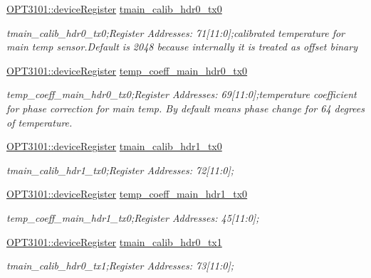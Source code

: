 \begin{DoxyCompactItemize}
\mbox{\hyperlink{class_o_p_t3101_1_1device_register}{O\+P\+T3101\+::device\+Register}} \mbox{\hyperlink{class_o_p_t3101_1_1registers_a8fae5df61376ad2ea79bb9b35ff75bed}{tmain\+\_\+calib\+\_\+hdr0\+\_\+tx0}}
\begin{DoxyCompactList}\small\item\em tmain\+\_\+calib\+\_\+hdr0\+\_\+tx0;Register Addresses\+: 71\mbox{[}11\+:0\mbox{]};calibrated temperature for main temp sensor.\+Default is 2048 because internally it is treated as offset binary \end{DoxyCompactList}\item 
\mbox{\hyperlink{class_o_p_t3101_1_1device_register}{O\+P\+T3101\+::device\+Register}} \mbox{\hyperlink{class_o_p_t3101_1_1registers_aafdc1b5540b6e0bb2ce2284f0b5206f1}{temp\+\_\+coeff\+\_\+main\+\_\+hdr0\+\_\+tx0}}
\begin{DoxyCompactList}\small\item\em temp\+\_\+coeff\+\_\+main\+\_\+hdr0\+\_\+tx0;Register Addresses\+: 69\mbox{[}11\+:0\mbox{]};temperature coefficient for phase correction for main temp. By default means phase change for 64 degrees of temperature. \end{DoxyCompactList}\item 
\mbox{\hyperlink{class_o_p_t3101_1_1device_register}{O\+P\+T3101\+::device\+Register}} \mbox{\hyperlink{class_o_p_t3101_1_1registers_a8014e98d54c2e1a92a2535da74900b37}{tmain\+\_\+calib\+\_\+hdr1\+\_\+tx0}}
\begin{DoxyCompactList}\small\item\em tmain\+\_\+calib\+\_\+hdr1\+\_\+tx0;Register Addresses\+: 72\mbox{[}11\+:0\mbox{]}; \end{DoxyCompactList}\item 
\mbox{\hyperlink{class_o_p_t3101_1_1device_register}{O\+P\+T3101\+::device\+Register}} \mbox{\hyperlink{class_o_p_t3101_1_1registers_aa6168acee7052f09cb874ecd4480b697}{temp\+\_\+coeff\+\_\+main\+\_\+hdr1\+\_\+tx0}}
\begin{DoxyCompactList}\small\item\em temp\+\_\+coeff\+\_\+main\+\_\+hdr1\+\_\+tx0;Register Addresses\+: 45\mbox{[}11\+:0\mbox{]}; \end{DoxyCompactList}\item 
\mbox{\hyperlink{class_o_p_t3101_1_1device_register}{O\+P\+T3101\+::device\+Register}} \mbox{\hyperlink{class_o_p_t3101_1_1registers_a68724aced807ba68873f5a6375bb611e}{tmain\+\_\+calib\+\_\+hdr0\+\_\+tx1}}
\begin{DoxyCompactList}\small\item\em tmain\+\_\+calib\+\_\+hdr0\+\_\+tx1;Register Addresses\+: 73\mbox{[}11\+:0\mbox{]}; \end{DoxyCompactList}\item 

\end{DoxyCompactItemize}
